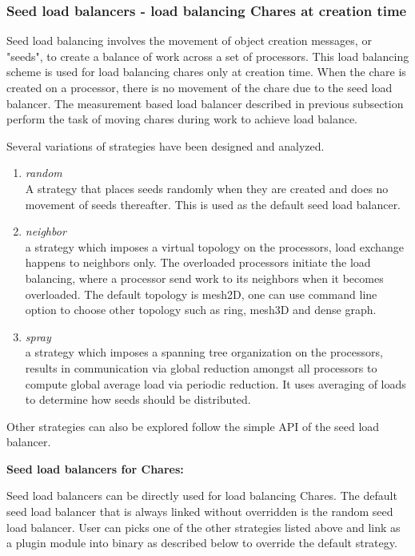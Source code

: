 \subsubsection{Seed load balancers - load balancing Chares at creation time}
\label{seedlb}

Seed load balancing involves the movement of object creation messages, or
"seeds", to create a balance of work across a set of processors. This load
balancing scheme is used for load balancing chares only at creation time. When
the chare is created on a processor, there is no movement of the chare due to
the seed load balancer. The measurement based load balancer described in
previous subsection perform the task of moving chares during work to achieve
load balance.

Several variations of strategies have been designed and analyzed. 
\begin{enumerate}
\item {\em random}\\  
 A strategy that places seeds randomly when they are created and does
no movement of seeds thereafter. This is used as the default seed 
load balancer.
\item {\em neighbor}\\  
 a strategy which imposes a virtual topology on the processors,
 load exchange happens to neighbors only. The overloaded processors
 initiate the load balancing, where a processor send work to its neighbors
 when it becomes overloaded. The default topology is mesh2D, one can use
 command line option to choose other topology such as ring, mesh3D and 
 dense graph.
\item {\em spray}\\  
 a strategy which imposes a spanning tree organization on the processors,
 results in communication via global reduction amongst all processors 
 to compute global average load via periodic reduction. 
 It uses averaging of loads to determine how seeds should be
distributed.
\end{enumerate}

Other strategies can also be explored follow the simple API of the 
seed load balancer.
\linebreak

{\bf Seed load balancers for Chares:}

Seed load balancers can be directly used for load balancing Chares.
The default seed load balancer that is always linked without overridden 
is the random seed load balancer.
User can picks one of the other strategies listed above and link as a plugin
module into binary as described below to override the default strategy.

